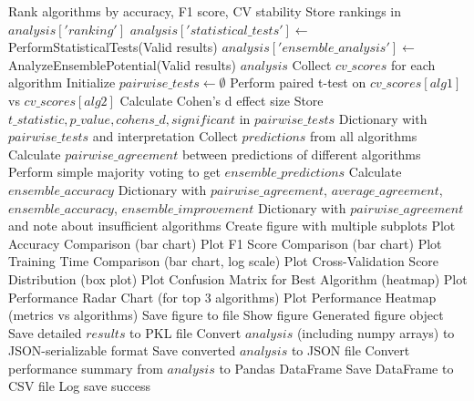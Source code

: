 \begin{algorithm}[!htbp]
\begin{algorithmic}[1]
        \State Rank algorithms by accuracy, F1 score, CV stability
        \State Store rankings in $analysis['ranking']$
    \EndIf
        \State $analysis['statistical\_tests'] \leftarrow$ PerformStatisticalTests(Valid results)
    \EndIf
    \State $analysis['ensemble\_analysis'] \leftarrow$ AnalyzeEnsemblePotential(Valid results)
    \Return $analysis$
\EndProcedure
\Statex
{}
    \State Collect $cv\_scores$ for each algorithm
    \State Initialize $pairwise\_tests \leftarrow \emptyset$
        \State Perform paired t-test on $cv\_scores[alg1]$ vs $cv\_scores[alg2]$
        \State Calculate Cohen's d effect size
        \State Store $t\_statistic, p\_value, cohens\_d, significant$ in $pairwise\_tests$
    \EndFor
    \Return Dictionary with $pairwise\_tests$ and interpretation
\EndProcedure
\Statex
{}
    \State Collect $predictions$ from all algorithms
    \State Calculate $pairwise\_agreement$ between predictions of different algorithms
        \State Perform simple majority voting to get $ensemble\_predictions$
        \State Calculate $ensemble\_accuracy$
        \Return Dictionary with $pairwise\_agreement$, $average\_agreement$, $ensemble\_accuracy$, $ensemble\_improvement$
    \Else
        \Return Dictionary with $pairwise\_agreement$ and note about insufficient algorithms
    \EndIf
\EndProcedure
\Statex
{}
    \State Create figure with multiple subplots
    \State Plot Accuracy Comparison (bar chart)
    \State Plot F1 Score Comparison (bar chart)
    \State Plot Training Time Comparison (bar chart, log scale)
    \State Plot Cross-Validation Score Distribution (box plot)
    \State Plot Confusion Matrix for Best Algorithm (heatmap)
    \State Plot Performance Radar Chart (for top 3 algorithms)
    \State Plot Performance Heatmap (metrics vs algorithms)
    \State Save figure to file
    \State Show figure
    \Return Generated figure object
\EndProcedure
\Statex
{}
    \State Save detailed $results$ to PKL file
    \State Convert $analysis$ (including numpy arrays) to JSON-serializable format
    \State Save converted $analysis$ to JSON file
    \State Convert performance summary from $analysis$ to Pandas DataFrame
    \State Save DataFrame to CSV file
    \State Log save success
\EndProcedure
\end{algorithmic}
\end{algorithm}

